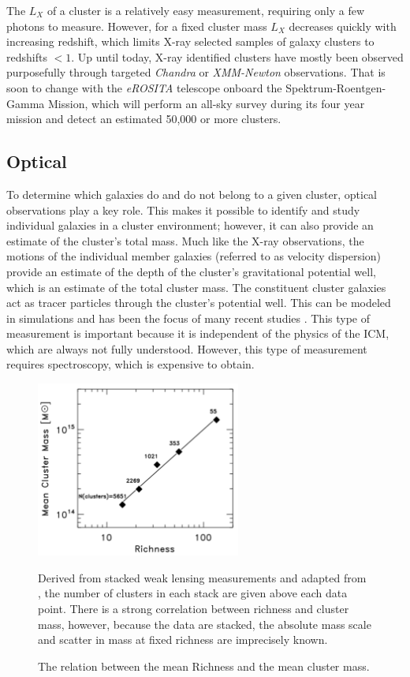 The $L_X$ of a cluster is a relatively easy measurement, requiring only a few photons to measure. However, for a fixed cluster mass $L_X$ decreases quickly with increasing redshift, which limits X-ray selected samples of galaxy clusters to redshifts $< 1$. Up until today, X-ray identified clusters have mostly been observed purposefully through targeted \textit{Chandra} or \textit{XMM-Newton} observations. That is soon to change with the \textit{eROSITA} \citep{Pillepich2012} telescope onboard the Spektrum-Roentgen-Gamma Mission, which will perform an all-sky survey during its four year mission and detect an estimated 50,000 or more clusters.

\subsection{Optical}
To determine which galaxies do and do not belong to a given cluster, optical observations play a key role. This makes it possible to identify and study individual galaxies in a cluster environment; however, it can also provide an estimate of the cluster's total mass. Much like the X-ray observations, the motions of the individual member galaxies (referred to as velocity dispersion) provide an estimate of the depth of the cluster's gravitational potential well, which is an estimate of the total cluster mass. The constituent cluster galaxies act as tracer particles through the cluster's potential well. This can be modeled in simulations and has been the focus of many recent studies . This type of measurement is important because it is independent of the physics of the ICM, which are always not fully understood. However, this type of measurement requires spectroscopy, which is expensive to obtain. 

\begin{figure}[t]
	\begin{center}
		\includegraphics[width=0.6\textwidth]{figures/massrichness.pdf}
	\end{center}
	\caption{The relation between the mean Richness and the mean cluster mass.} 
	Derived from stacked weak lensing measurements and adapted from \citealt{Rozo2010}, the number of clusters in each stack are given above each data point. There is a strong correlation between richness and cluster mass, however, because the data are stacked, the absolute mass scale and scatter in mass at fixed richness are imprecisely known.
	\label{fig:massrichness}
\end{figure}

